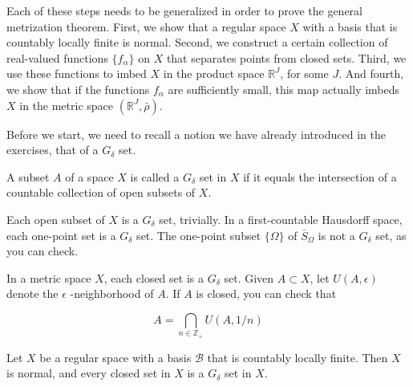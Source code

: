 Each of these steps needs to be generalized in order to prove the general metrization theorem. First, we show that a regular space \(X\) with a basis that is countably locally finite is normal. Second, we construct a certain collection of real-valued functions \(\{ f_{\alpha }\}\) on \(X\) that separates points from closed sets. Third, we use these functions to imbed \(X\) in the product space \(\mathbb{R}^{J}\), for some \(J\). And fourth, we show that if the functions \(f_{\alpha }\) are sufficiently small, this map actually imbeds \(X\) in the metric space \(({\mathbb{R}^{J},\bar{\rho }})\).

Before we start, we need to recall a notion we have already introduced in the exercises, that of a \(G_{\delta }\) set.

\begin{definition}
 A subset \(A\) of a space \(X\) is called a \(G_{\delta }\) set in \(X\) if it equals the intersection of a countable collection of open subsets of \(X\).
\end{definition}

\begin{centeredblock}
\begin{example}
\label{ex:\thesection.\theexample}
 Each open subset of \(X\) is a \(G_{\delta }\) set, trivially. In a first-countable Hausdorff space, each one-point set is a \(G_{\delta }\) set. The one-point subset \(\{ \Omega \}\) of \(\bar{S}_{\Omega }\) is not a \(G_{\delta }\) set, as you can check.
\end{example}
\end{centeredblock}

\begin{centeredblock}
\begin{example}
\label{ex:\thesection.\theexample}
 In a metric space \(X\), each closed set is a \(G_{\delta }\) set. Given \(A \subset X\), let \(U({A,\epsilon })\) denote the \(\epsilon\) -neighborhood of \(A\). If \(A\) is closed, you can check that

\[
A = \mathop{\bigcap }\limits_{{n \in {\mathbb{Z}}_{ + }}}U({A,1/n})
\]
\end{example}
\end{centeredblock}

\begin{lemma}
\label{lem:\thetheorem}
 Let \(X\) be a regular space with a basis \(\mathcal{B}\) that is countably locally finite. Then \(X\) is normal, and every closed set in \(X\) is a \(G_{\delta }\) set in \(X\).
\end{lemma}

